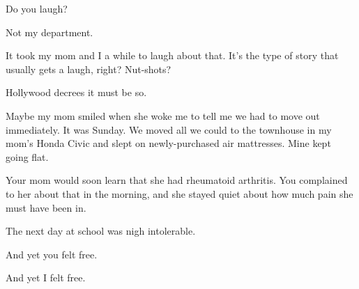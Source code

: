 Do you laugh?

\begin{ally}
Not my department.
\end{ally}
It took my mom and I a while to laugh about that. It's the type of story that usually gets a laugh, right? Nut-shots?

\begin{ally}
Hollywood decrees it must be so.
\end{ally}
Maybe my mom smiled when she woke me to tell me we had to move out immediately. It was Sunday. We moved all we could to the townhouse in my mom's Honda Civic and slept on newly-purchased air mattresses. Mine kept going flat.

\begin{ally}
Your mom would soon learn that she had rheumatoid arthritis. You complained to her about that in the morning, and she stayed quiet about how much pain she must have been in.
\end{ally}
The next day at school was nigh intolerable.

\begin{ally}
And yet you felt free.
\end{ally}
And yet I felt free.
\newpage
\renewcommand*{\footnoterule}{\oldfootnoterule}
